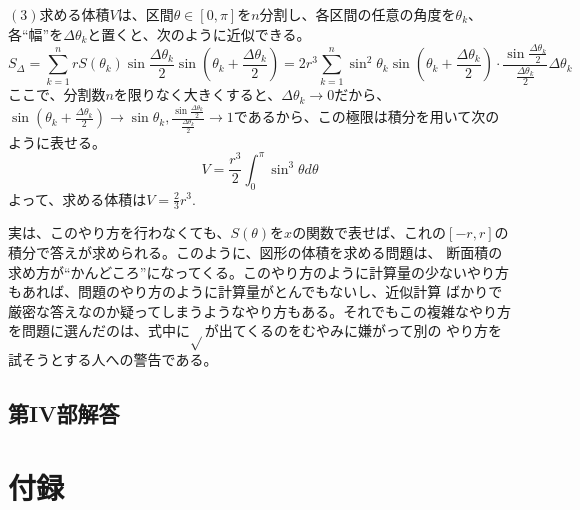 \documentclass[a4j,dvipdfmx]{jsarticle}
\begin{document}
                        $(3)$求める体積$V$は、区間$\theta\in[0,\pi]$を$n$分割し、各区間の任意の角度を$\theta_k$、各``幅''を$\Delta \theta_k$と置くと、次のように近似できる。
                        \begin{equation*}
                            S_\Delta =\sum_{k=1}^{n}rS(\theta_k)\sin\frac{\Delta\theta_k}{2}\sin\left(\theta_k+\frac{\Delta\theta_k}{2}\right)=2r^3\sum_{k=1}^{n}\sin^2\theta_k \sin\left(\theta_k+\frac{\Delta \theta_k}{2}\right)\cdot \frac{\sin\frac{\Delta \theta_k}{2}}{\frac{\Delta\theta_k}{2}}\Delta \theta_k
                        \end{equation*}
                        ここで、分割数$n$を限りなく大きくすると、$\Delta \theta_k\to 0$だから、$\displaystyle \sin\left(\theta_k +\frac{\Delta\theta_k}{2}\right)\to\sin\theta_k,\frac{\sin\frac{\Delta \theta_k}{2}}{\frac{\Delta\theta_k}{2}}\to 1$であるから、この極限は積分を用いて次のように表せる。
                        \begin{equation*}
                            V=\frac{r^3}{2}\int_{0}^{\pi}\sin^3\theta d\theta
                        \end{equation*}
                        よって、求める体積は$V=\frac{2}{3}r^3.$

                        実は、このやり方を行わなくても、$S(\theta)$を$x$の関数で表せば、これの$[-r,r]$の積分で答えが求められる。このように、図形の体積を求める問題は、
                        断面積の求め方が``かんどころ''になってくる。このやり方のように計算量の少ないやり方もあれば、問題のやり方のように計算量がとんでもないし、近似計算
                        ばかりで厳密な答えなのか疑ってしまうようなやり方もある。それでもこの複雑なやり方を問題に選んだのは、式中に$\sqrt{}$が出てくるのをむやみに嫌がって別の
                        やり方を試そうとする人への警告である。
                \clearpage
                \subsection*{第IV部解答}
                
                    
                        



                    
        \clearpage
            
        \color{black}
        \section{付録}
\end{document}
